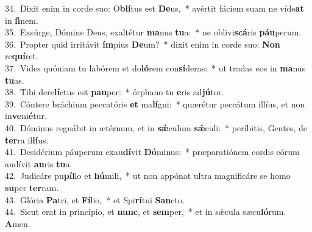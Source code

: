 {34.~}Dixit enim in corde suo: O\textbf{blí}tus est \textbf{De}us,~* avértit fáciem suam ne víde\textbf{at} in \textbf{fi}nem.\\
{35.~}Exsúrge, Dómine Deus, exaltétur \textbf{ma}nus \textbf{tu}a:~* ne oblivi\textbf{scá}ris \textbf{páu}perum.\\
{36.~}Propter quid irritávit \textbf{ím}pius \textbf{De}um?~* dixit enim in corde suo: \textbf{Non} re\textbf{quí}ret.\\
{37.~}Vides quóniam tu labórem et do\textbf{ló}rem con\textbf{sí}deras:~* ut tradas eos in \textbf{ma}nus \textbf{tu}as.\\
{38.~}Tibi dere\textbf{lí}ctus est \textbf{pau}per:~* órphano tu \textbf{e}ris ad\textbf{jú}tor.\\
{39.~}Cóntere bráchium peccatóris \textbf{et} ma\textbf{lí}gni:~* quærétur peccátum illíus, et non in\textbf{ve}ni\textbf{é}tur.\\
{40.~}Dóminus regnábit in ætérnum, et in \textbf{sǽ}culum \textbf{sǽ}culi:~* períbitis, Gentes, de \textbf{ter}ra il\textbf{lí}us.\\
{41.~}Desidérium páuperum exau\textbf{dí}vit \textbf{Dó}minus:~* præparatiónem cordis eórum audívit \textbf{au}ris \textbf{tu}a.\\
{42.~}Judicáre pu\textbf{píl}lo et \textbf{hú}mili,~* ut non appónat ultra magnificáre se homo \textbf{su}per \textbf{ter}ram.\\
{43.~}Glória \textbf{Pa}tri, et \textbf{Fí}lio,~* et Spi\textbf{rí}tui \textbf{San}cto.\\
{44.~}Sicut erat in princípio, et \textbf{nunc}, et \textbf{sem}per,~* et in sǽcula sæcu\textbf{ló}rum. \textbf{A}men.\\
